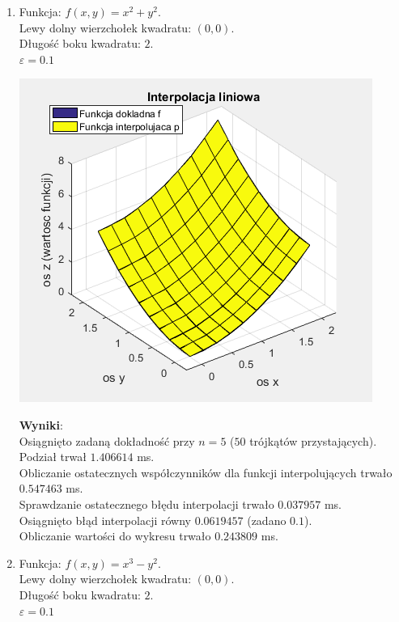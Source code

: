\documentclass[12pt]{article}
\begin{document}
\begin{enumerate}[label=\textbf{Przykład \arabic*}]
		
		
		\item
		Funkcja: $f(x, y) = x^2 + y^2$.\\
		Lewy dolny wierzchołek kwadratu: $(0, 0)$.\\
		Długość boku kwadratu: $2$.\\
		$\varepsilon = 0.1$
		
		\includegraphics[]{images/example-5.png}
		
		\textbf{Wyniki}:\\
		Osiągnięto zadaną dokładność przy $n = 5$ ($50$ trójkątów przystających).\\
		Podział trwał $1.406614$ ms.\\
		Obliczanie ostatecznych współczynników dla funkcji interpolujących trwało $0.547463$ ms.\\
		Sprawdzanie ostatecznego błędu interpolacji trwało $0.037957$ ms.\\
		Osiągnięto błąd interpolacji równy $0.0619457$ (zadano $0.1$).\\
		Obliczanie wartości do wykresu trwało $0.243809$ ms.
		\pagebreak
		
		
		\item
		Funkcja: $f(x, y) = x^3 - y^2$.\\
		Lewy dolny wierzchołek kwadratu: $(0, 0)$.\\
		Długość boku kwadratu: $2$.\\
		$\varepsilon = 0.1$
		

\end{enumerate}
\end{document}
